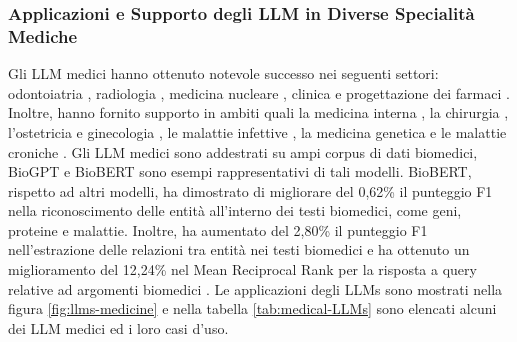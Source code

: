 \subsubsection{Applicazioni e Supporto degli LLM in Diverse Specialità Mediche}
Gli LLM medici hanno ottenuto notevole successo nei seguenti settori: odontoiatria \cite{huang2023chatgpt}, radiologia \cite{d2024large}, medicina nucleare \cite{wang2023huatuo}, clinica \cite{singhal2023large} e progettazione dei farmaci \cite{chakraborty2023artificial}. Inoltre, hanno fornito supporto in ambiti quali la medicina interna \cite{omiye2024large}, la chirurgia \cite{puladi2023impact}, l'ostetricia e ginecologia \cite{grunebaum2023exciting}, le malattie infettive \cite{schwartz2024black}, la medicina genetica \cite{feldman2019development} e le malattie croniche \cite{biswas2023role}. Gli LLM medici sono addestrati su ampi corpus di dati biomedici, BioGPT \cite{luo2022biogpt} e BioBERT \cite{lee2020biobert} sono esempi rappresentativi di tali modelli.
BioBERT, rispetto ad altri modelli, ha dimostrato di migliorare del 0,62\% il punteggio F1 nella riconoscimento delle entità all'interno dei testi biomedici, come geni, proteine e malattie. Inoltre, ha aumentato del 2,80\% il punteggio F1 nell'estrazione delle relazioni tra entità nei testi biomedici e ha ottenuto un miglioramento del 12,24\% nel Mean Reciprocal Rank per la risposta a query relative ad argomenti biomedici \cite{zheng2024large}.
Le applicazioni degli LLMs sono mostrati nella figura \ref{fig:llms-medicine} e nella tabella \ref{tab:medical-LLMs} sono elencati alcuni dei LLM medici ed i loro casi d'uso.

